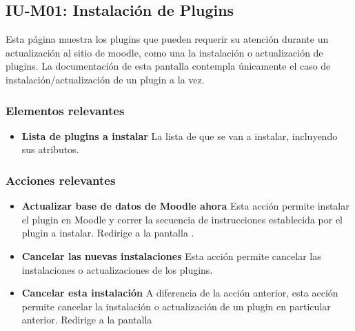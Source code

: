
\subsection{IU-M01: Instalación de Plugins}

 Esta página muestra los plugins que pueden requerir su atención durante un actualización al sitio
 de moodle, como una la instalación o actualización de plugins. La documentación de esta pantalla
 contempla únicamente el caso de instalación/actualización de un plugin a la vez.


\subsubsection{Elementos relevantes}

    \begin{itemize}
    \item {\bf Lista de plugins a instalar}
        La lista de  que se van a instalar, incluyendo
        sus atributos.
    \end{itemize}

\subsubsection{Acciones relevantes}

    \begin{itemize}
    \item {\bf Actualizar base de datos de Moodle ahora}
        Esta acción permite instalar el plugin en Moodle y correr la secuencia de
        instrucciones establecida por el plugin a instalar. Redirige a la pantalla
        .

    \item {\bf Cancelar las nuevas instalaciones}
        Esta acción permite cancelar las instalaciones o actualizaciones de los plugins.

    \item {\bf Cancelar esta instalación}
        A diferencia de la acción anterior, esta acción permite cancelar la instalación
        o actualización de un plugin en particular anterior. Redirige a la pantalla
    \end{itemize}
